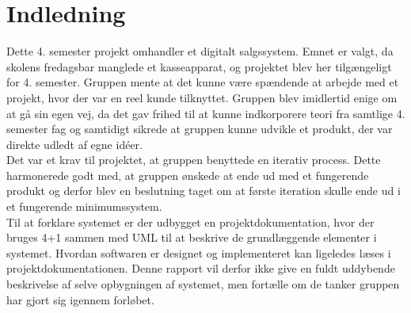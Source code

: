 \chapter{Indledning}
Dette 4. semester projekt omhandler et digitalt salgssystem. Emnet er valgt, da skolens fredagsbar manglede et kasseapparat, og projektet blev her tilgængeligt for 4. semester. Gruppen mente at det kunne være spændende at arbejde med et projekt, hvor der var en reel kunde tilknyttet. Gruppen blev imidlertid enige om at gå sin egen vej, da det gav frihed til at kunne indkorporere teori fra samtlige 4. semester fag og samtidigt sikrede at gruppen kunne udvikle et produkt, der var direkte udledt af egne idéer. \\

Det var et krav til projektet, at gruppen benyttede en iterativ process. Dette harmonerede godt med, at gruppen ønskede at ende ud med et fungerende produkt og derfor blev en beslutning taget om at første iteration skulle ende ud i et fungerende minimumssystem. \\

Til at forklare systemet er der udbygget en projektdokumentation, hvor der bruges 4+1 sammen med UML til at beskrive de grundlæggende elementer i systemet. Hvordan softwaren er designet og implementeret kan ligeledes læses i projektdokumentationen.
Denne rapport vil derfor ikke give en fuldt uddybende beskrivelse af selve opbygningen af systemet, men fortælle om de tanker gruppen har gjort sig igennem forløbet.